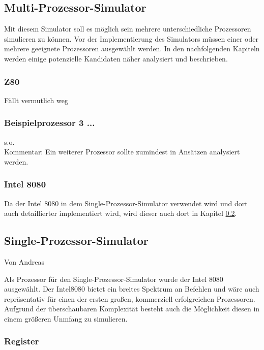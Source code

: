 \documentclass[12pt]{article}
\begin{document}
\newpage

\subsection{Multi-Prozessor-Simulator}
Mit diesem Simulator soll es möglich sein mehrere unterschiedliche Prozessoren simulieren zu können. Vor der Implementierung des Simulators müssen einer oder mehrere geeignete Prozessoren ausgewählt werden. In den nachfolgenden Kapiteln werden einige potenzielle Kandidaten näher analysiert und beschrieben.



\subsubsection{Z80}
Fällt vermutlich weg

\subsubsection{Beispielprozessor 3 ...}
s.o.\\
Kommentar: Ein weiterer Prozessor sollte zumindest in Ansätzen analysiert werden.

\subsubsection{Intel 8080}
Da der Intel 8080 in dem Single-Prozessor-Simulator verwendet wird und dort auch detaillierter implementiert wird, wird dieser auch dort in Kapitel \ref{SPS}.


\newpage

\subsection{Single-Prozessor-Simulator}
\label{SPS} 
Von Andreas\\ \noindent

Als Prozessor für den Single-Prozessor-Simulator wurde der Intel 8080 ausgewählt. Der Intel8080 bietet ein breites Spektrum an Befehlen und wäre auch repräsentativ für einen der ersten großen, kommerziell erfolgreichen Prozessoren. Aufgrund der überschaubaren Komplexität besteht auch die Möglichkeit diesen in einem größeren Unmfang zu simulieren.

\subsubsection{Register}
\label{RegisterSection}
\end{document}
